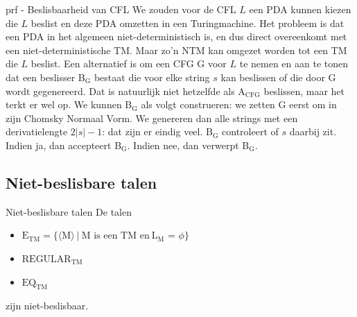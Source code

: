 \begin{prf}{prf - Beslisbaarheid van CFL}
    We zouden voor de CFL $L$ een PDA kunnen kiezen die $L$ beslist en deze PDA omzetten in een Turingmachine. Het probleem is dat een PDA in het algemeen niet-deterministisch is, en dus direct overeenkomt met een niet-deterministische TM\@. Maar zo'n NTM kan omgezet worden tot een TM die $L$ beslist. Een alternatief is om een CFG G voor $L$ te nemen en aan te tonen dat een beslisser B$_\text{G}$ bestaat die voor elke string $s$ kan beslissen of die door G wordt gegenereerd. Dat is natuurlijk niet hetzelfde als A$_{\text{CFG}}$ beslissen, maar het terkt er wel op. We kunnen B$_\text{G}$ als volgt construeren: we zetten G eerst om in zijn Chomsky Normaal Vorm. We genereren dan alle strings met een derivatielengte $2|s| - 1$: dat zijn er eindig veel. B$_\text{G}$ controleert of $s$ daarbij zit. Indien ja, dan accepteert B$_\text{G}$. Indien nee, dan verwerpt B$_\text{G}$.
\end{prf}

\newpage

\subsection{Niet-beslisbare talen}

\vspace{0.5cm}

\begin{lem}{Niet-beslisbare talen}
    De talen
    \begin{itemize}
        \item 
            $\text{E}_{\text{TM}} = \{\langle \text{M} \rangle \ | \ \text{M is een TM en} \ \text{L$_{\text{M}}$ = $\phi$} \}$
        \item 
            $\text{REGULAR}_{\text{TM}}$
        \item 
            $\text{EQ}_{\text{TM}}$
    \end{itemize}
    zijn niet-beslisbaar.
\end{lem}

